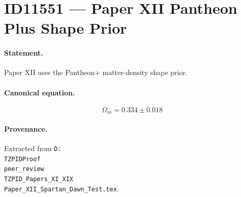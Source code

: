 \section*{ID11551 --- Paper XII Pantheon Plus Shape Prior}

\paragraph{Statement.}
Paper XII uses the Pantheon+ matter-density shape prior.

\paragraph{Canonical equation.}
\[
\Omega_m=0.334\pm0.018
\]

\paragraph{Provenance.}
Extracted from \texttt{D:\\TZPIDProof\\peer\_review\\TZPID\_Papers\_XI\_XIX\\Paper\_XII\_Spartan\_Dawn\_Test.tex}.
